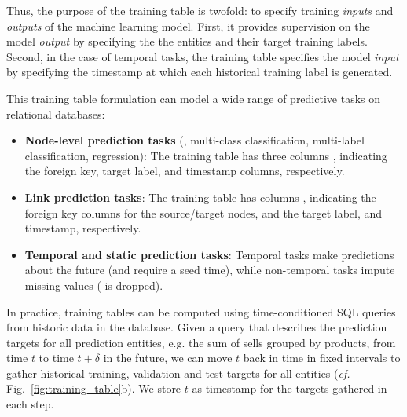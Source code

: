 Thus, the purpose of the training table is twofold: to specify training \emph{inputs} and \emph{outputs} of the machine learning model. First, it provides supervision on the model \emph{output} by specifying the the entities and their target training labels. Second, in the case of temporal tasks, the training table specifies the model \emph{input} by specifying the timestamp at which each historical training label is generated. 



This training table formulation can model a wide range of predictive tasks on relational databases:
\begin{itemize}
    \item {\bf Node-level prediction tasks} (\eg, multi-class classification, multi-label classification, regression): The training table has three columns , indicating the foreign key, target label, and timestamp columns, respectively.
    \item {\bf Link prediction tasks}: The training table has columns , indicating the foreign key columns for the source/target nodes, and the target label, and timestamp, respectively.
    \item \textbf{Temporal and static prediction tasks}: Temporal tasks make predictions about the future (and require a seed time), while non-temporal tasks impute missing values ( is dropped).
\end{itemize}



 In practice, training tables can be computed using time-conditioned SQL queries from historic data in the database. Given a query that describes the prediction targets for all prediction entities, e.g. the sum of sells grouped by products, from time $t$ to time $t+\delta$ in the future, we can move $t$ back in time in fixed intervals to gather historical training, validation and test targets for all entities (\emph{cf.} Fig.~\ref{fig:training_table}b). We store $t$ as timestamp for the targets gathered in each step.

